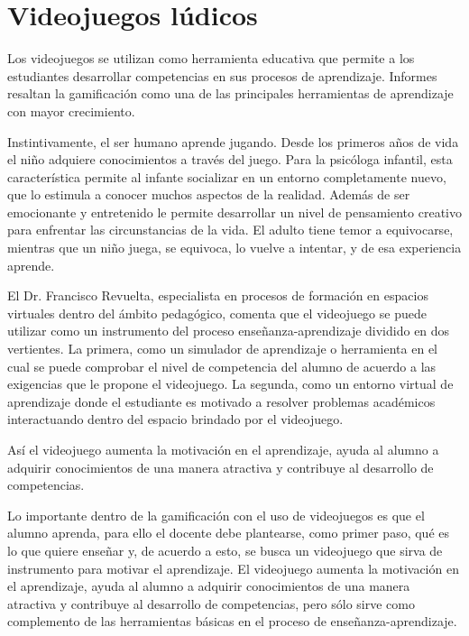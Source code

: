 \documentclass{article}
\begin{document}
\section{Videojuegos lúdicos}

Los videojuegos se utilizan como herramienta educativa que permite a los estudiantes desarrollar competencias en sus procesos de aprendizaje. Informes resaltan la gamificación como una de las principales herramientas de aprendizaje con mayor crecimiento.

Instintivamente, el ser humano aprende jugando. Desde los primeros años de vida el niño adquiere conocimientos a través del juego. Para la psicóloga infantil, esta característica permite al infante socializar en un entorno completamente nuevo, que lo estimula a conocer muchos aspectos de la realidad. Además de ser emocionante y entretenido le permite desarrollar un nivel de pensamiento creativo para enfrentar las circunstancias de la vida. El adulto tiene temor a equivocarse, mientras que un niño juega, se equivoca, lo vuelve a intentar, y de esa experiencia aprende.

El Dr. Francisco Revuelta, especialista en procesos de formación en espacios virtuales dentro del ámbito pedagógico, comenta que el videojuego se puede utilizar como un instrumento del proceso enseñanza-aprendizaje dividido en dos vertientes. 
La primera, como un simulador de aprendizaje o herramienta en el cual se puede comprobar el nivel de competencia del alumno de acuerdo a las exigencias que le propone el videojuego.  
La segunda, como un entorno virtual de aprendizaje donde el estudiante es motivado a resolver problemas académicos interactuando dentro del espacio brindado por el videojuego.

Así el videojuego aumenta la motivación en el aprendizaje, ayuda al alumno a adquirir conocimientos de una manera atractiva y contribuye al desarrollo de competencias.

Lo importante dentro de la gamificación con el uso de videojuegos es que el alumno aprenda, para ello el docente debe plantearse, como primer paso, qué es lo que quiere enseñar y, de acuerdo a esto, se busca un videojuego que sirva de instrumento para motivar el aprendizaje. El videojuego aumenta la motivación en el aprendizaje, ayuda al alumno a adquirir conocimientos de una manera atractiva y contribuye al desarrollo de competencias, pero sólo sirve como complemento de las herramientas básicas en el proceso de enseñanza-aprendizaje. 
\end{document}
